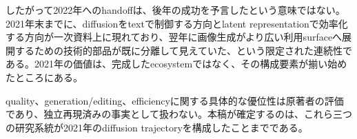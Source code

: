 したがって2022年へのhandoffは、後年の成功を予言したという意味ではない。2021年末までに、diffusionをtextで制御する方向とlatent representationで効率化する方向が一次資料上に現れており、翌年に画像生成がより広い利用surfaceへ展開するための技術的部品が既に分離して見えていた、という限定された連続性である。2021年の価値は、完成したecosystemではなく、その構成要素が揃い始めたところにある。\autocite{src-50244427230b,src-a4561c635fe6}


\begin{claimboundary}
quality、generation/editing、efficiencyに関する具体的な優位性は原著者の評価であり、独立再現済みの事実として扱わない。本稿が確定するのは、これら三つの研究系統が2021年のdiffusion trajectoryを構成したことまでである。\autocite{src-11a149a699a0,src-50244427230b,src-a4561c635fe6}
\end{claimboundary}
